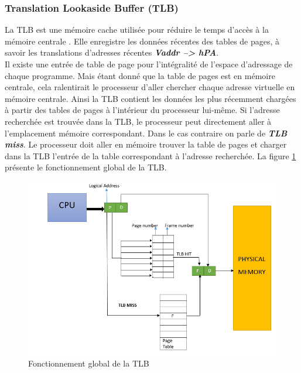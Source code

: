\subsubsection{Translation Lookaside Buffer (TLB)}
La TLB est une mémoire cache utilisée pour réduire le temps d'accès à la mémoire centrale \cite{article7, book2}. Elle enregistre les données récentes des tables de pages, à savoir les translations d'adresses récentes \textit{\textbf{\acs{Vaddr} --> hPA}}.\\
Il existe une entrée de table de page pour l'intégralité de l'espace d'adressage de chaque programme. Mais étant donné que la table de pages est en mémoire centrale, cela ralentirait le processeur d'aller chercher chaque adresse virtuelle en mémoire centrale. Ainsi la TLB contient les données les plus récemment chargées à partir des tables de pages à l'intérieur du processeur lui-même. Si l'adresse recherchée est trouvée dans la TLB, le processeur peut directement aller à l'emplacement mémoire correspondant. Dans le cas contraire on parle de \textit{\textbf{TLB miss}}. Le processeur doit aller en mémoire trouver la table de pages et charger dans la TLB l'entrée de la table correspondant à l'adresse recherchée. La figure \ref{fig:tlb} présente le fonctionnement global de la TLB.
\begin{figure}[htp]
    \centering
    \includegraphics[width=1\linewidth]{chapters/1/fig1/tlb}
    \caption{Fonctionnement global de la TLB}
    \label{fig:tlb}
\end{figure}

